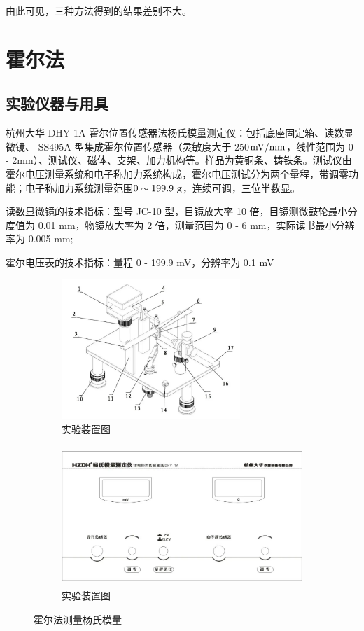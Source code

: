 \documentclass[UTF8]{article}
\theoremstyle{MyLineTheoremStyle} %
\theoremstyle{MyBlockTheoremStyle} %
\theoremstyle{MySubsubsectionStyle} %
\begin{document}
由此可见，三种方法得到的结果差别不大。


\section{霍尔法}
\subsection{实验仪器与用具}

杭州大华 DHY-1A 霍尔位置传感器法杨氏模量测定仪：包括底座固定箱、读数显微镜、 SS495A 型集成霍尔位置传感器（灵敏度大于 250$\rm mV/mm$，线性范围为 0 - 2mm）、测试仪、磁体、支架、加力机构等。样品为黄铜条、铸铁条。测试仪由霍尔电压测量系统和电子称加力系统构成，霍尔电压测试分为两个量程，带调零功能；电子称加力系统测量范围$0\sim199.9\,\,{\rm g}$，连续可调，三位半数显。


读数显微镜的技术指标：型号 JC-10 型，目镜放大率 10 倍，目镜测微鼓轮最小分度值为 0.01 mm，物镜放大率为 2 倍，测量范围为 0 - 6 mm，实际读书最小分辨率为 0.005 mm;

霍尔电压表的技术指标：量程 0 - 199.9 mV，分辨率为 0.1 mV


\begin{figure}[H]\centering
\begin{subfigure}[b]{0.4\columnwidth}\centering
    \includegraphics[height=150pt]{assets/0/image (19).png}
    \caption{实验装置图}
\end{subfigure}\hfill
\begin{subfigure}[b]{0.6\columnwidth}\centering
    \includegraphics[height=150pt]{assets/0/image (20).png}
    \caption{实验装置图}
\end{subfigure}
\caption{霍尔法测量杨氏模量}
\end{figure}
\end{document}
